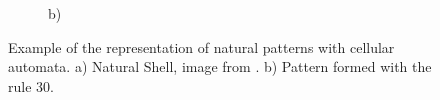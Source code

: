 \begin{figure}
\begin{subfigure}[b]{0.45\textwidth}
				\caption{b)}
				\label{fig:CArule30}
        \end{subfigure}
        \caption{Example of the representation of natural patterns with cellular automata. a) Natural Shell, image from \cite{Shiffman2012}. b) Pattern formed with the rule 30.}
		\label{fig:CArule30shell}
\end{figure}



